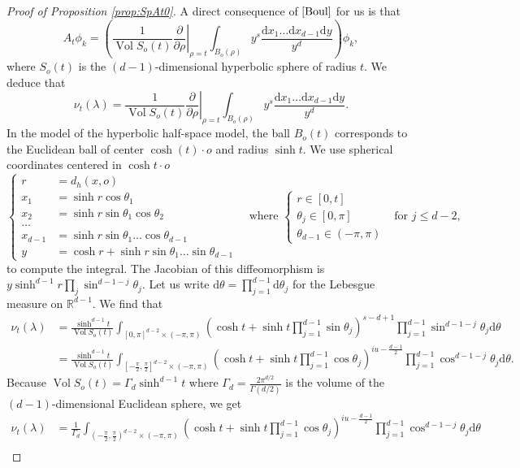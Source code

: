 \documentclass[]{scrartcl}
\newcommand{\R}{\mathds{R}}
\renewcommand{\d}{\mathrm{d}}
\DeclareMathOperator{\Vol}{Vol}
\numberwithin{equation}{section}
\numberwithin{figure}{section}
\begin{document}
\begin{proof}[Proof of Proposition \ref{prop:SpAt0}]
	A direct consequence of $\eqref{Boul}$ for us is that  \[A_t\phi_k =  \left(\frac{1}{\Vol {S_o(t)} }\left.\frac{\partial}{\partial \rho}\right\vert_{\rho = t}\int_{B_o(\rho)}{ y^s}{ \frac{\d x_1\dots \d x_{d-1} \d y}{y^d}} \right)\phi_k,\]
	where $S_o(t)$ is the $(d-1)$-dimensional hyperbolic sphere of radius $t$. We deduce that \[\nu_t(\lambda) = \frac{1}{\Vol {S_o(t)} }\left.\frac{\partial}{\partial \rho}\right\vert_{\rho = t}\int_{B_o(\rho)}{ y^s}{ \frac{\d x_1\dots \d x_{d-1} \d y}{y^d}}.\] 
	In the model of the hyperbolic half-space model, the ball $B_o(t)$ corresponds to the Euclidean ball of center $\cosh(t) \cdot o$ and radius $\sinh t$.  We use spherical coordinates centered in $\cosh t \cdot o$ \[\begin{cases}
		r &= d_h(x, o)\\
		x_1 &= \sinh r \cos\theta_1\\
		x_2 &= \sinh r \sin\theta_1\cos{\theta_2}\\
		\dots\\
		x_{d-1} &= \sinh r \sin\theta_1 \dots \cos \theta_{d-1}\\ 
		y &= \cosh r + \sinh r \sin\theta_1 \dots \sin \theta_{d-1}
	\end{cases} \quad \text{where } \begin{cases} r \in [0, t]\\ \theta_j \in [0, \pi]& \text{ for } j \leq d-2,\\ \theta_{d-1} \in (-\pi, \pi)\end{cases}\]
	to compute the integral. The Jacobian of this diffeomorphism is $y\sinh^{d-1} r \prod_{j}\sin^{d-1-j}\theta_j$. Let us write $\d\theta = \prod_{j= 1}^{d-1} \d\theta_j$ for the Lebesgue measure on $\R^{d-1}$. We find that  \begin{align*} \nu_t(\lambda) &=\frac{\sinh^{d-1} t}{\Vol S_o(t)} \int_{[0, \pi]^{d-2}\times(-\pi, \pi)}\left(\cosh t + \sinh t\prod_{j = 1}^{d-1} \sin \theta_j\right)^{s-d+1} \prod_{j = 1}^{d-1} \sin^{d-1-j}\theta_j \d\theta \\&=\frac{\sinh^{d-1} t}{\Vol S_o(t)} \int_{[-\frac{\pi}{2}, \frac{\pi}{2}]^{d-2}\times(-\pi, \pi)}\left(\cosh t + \sinh t \prod_{j=1}^{d-1} \cos \theta_j\right)^{iu-\frac{d-1}{2}} \prod_{j = 1}^{d-1} \cos^{d-1-j}\theta_j \d\theta.
	\end{align*} Because $\Vol S_o(t) = \Gamma_d \sinh^{d-1}t$ where $\Gamma_d =  \frac{2\pi^{d/2}}{ \Gamma (d/2)}$ is the volume of the $(d-1)$-dimensional Euclidean sphere, we get
	\begin{align*}
		\nu_t (\lambda) &=\frac{1}{\Gamma_d} \int_{(-\frac{\pi}{2}, \frac{\pi}{2})^{d-2}\times (-\pi, \pi)}\left(\cosh t + \sinh t\prod_{j=1}^{d-1} \cos \theta_j\right)^{iu-\frac{d-1}{2}} \prod_{j = 1}^{d-1} \cos^{d-1-j}\theta_j \d\theta \\ 

\end{align*}
\end{proof}
\end{document}
